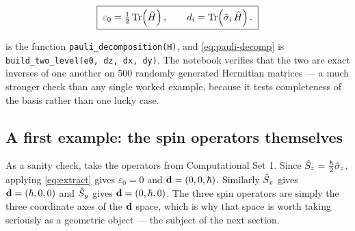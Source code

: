 \begin{equation}
\boxed{\;\varepsilon_0 = \tfrac{1}{2}\operatorname{Tr}\!\left(\hat{H}\right),
\qquad
d_i = \operatorname{Tr}\!\left(\hat\sigma_i\,\hat{H}\right).\;}
\label{eq:extract}
\end{equation}

\begin{nbbox}
 is the function \texttt{pauli\_decomposition(H)}, and
\cref{eq:pauli-decomp} is \texttt{build\_two\_level(e0, dz, dx, dy)}. The notebook
verifies that the two are exact inverses of one another on 500 randomly generated
Hermitian matrices --- a much stronger check than any single worked example, because
it tests completeness of the basis rather than one lucky case.
\end{nbbox}

\subsection{A first example: the spin operators themselves}

As a sanity check, take the operators from Computational Set 1. Since
$\hat{S}_z = \tfrac{\hbar}{2}\hat{\sigma}_z$, applying \cref{eq:extract} gives
$\varepsilon_0=0$ and $\mathbf{d} = (0,0,\hbar)$. Similarly $\hat{S}_x$ gives
$\mathbf{d}=(\hbar,0,0)$ and $\hat{S}_y$ gives $\mathbf{d}=(0,\hbar,0)$. The three spin operators are
simply the three coordinate axes of the $\mathbf{d}$ space, which is why that space is worth
taking seriously as a geometric object --- the subject of the next section.
